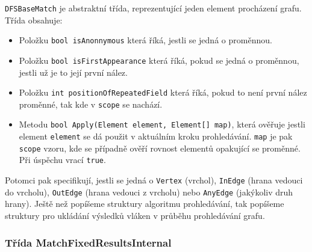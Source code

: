 \texttt{DFSBaseMatch} je abstraktní třída, reprezentující jeden element procházení grafu.
Třída obsahuje:
\begin{itemize}
\item Položku \texttt{bool isAnonnymous} která říká, jestli se jedná o proměnnou.
\item Položku \texttt{bool isFirstAppearance} která říká, pokud se jedná o proměnnou, jestli už je to její první nález.
\item Položku \texttt{int positionOfRepeatedField} která říká, pokud to není první nález proměnné, tak kde v \texttt{scope} se nachází. 
\item Metodu \texttt{bool Apply(Element element, Element[] map)}, která ověřuje jestli element \texttt{element} se dá použit v aktuálním kroku prohledávání.
\texttt{map} je pak \texttt{scope} vzoru, kde se případně ověří rovnost elementů opakující se proměnné. Při úspěchu vrací \texttt{true}.
\end{itemize}
Potomci pak specifikují, jestli se jedná o \texttt{Vertex} (vrchol), \texttt{InEdge} (hrana vedouci do vrcholu), \texttt{OutEdge} (hrana vedouci z vrcholu) nebo \texttt{AnyEdge} (jakýkoliv druh hrany).
Ještě než popíšeme struktury algoritmu prohledávání, tak popíšeme struktury pro ukládání výsledků vláken v průběhu prohledávání grafu.

\subsubsection{Třída MatchFixedResultsInternal} \label{impl.match.table}

